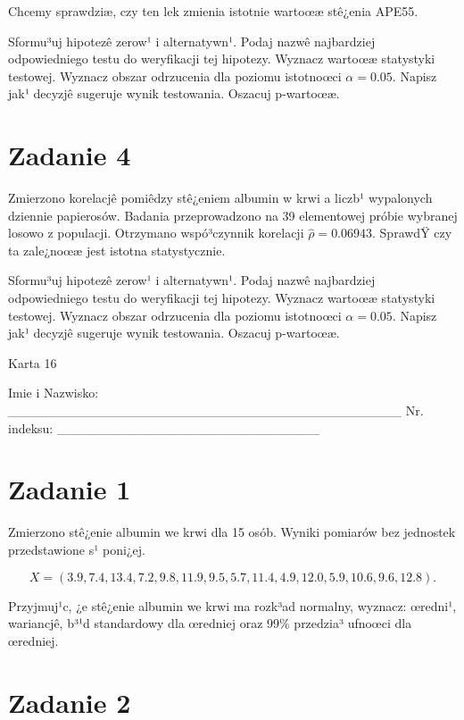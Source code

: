 \documentclass[a4paper,12pt]{article}
\begin{document}
  Chcemy sprawdziæ, czy ten lek zmienia istotnie wartoœæ stê¿enia APE55.
  
  Sformu³uj hipotezê zerow¹ i alternatywn¹. 
  Podaj nazwê najbardziej odpowiedniego testu do weryfikacji tej hipotezy. 
  Wyznacz wartoœæ statystyki testowej. 
  Wyznacz obszar odrzucenia dla poziomu istotnoœci $\alpha=0.05$. 
  Napisz jak¹ decyzjê sugeruje wynik testowania. Oszacuj p-wartoœæ. \vspace{1cm} 

  \section*{Zadanie 4}
     
     Zmierzono korelacjê pomiêdzy stê¿eniem albumin w krwi a liczb¹ wypalonych dziennie papierosów. 
     Badania przeprowadzono na 39 elementowej próbie wybranej losowo z populacji. 
     Otrzymano wspó³czynnik korelacji $\hat\rho = 0.06943 $. 
     SprawdŸ czy ta zale¿noœæ jest istotna statystycznie. 
     
     Sformu³uj hipotezê zerow¹ i alternatywn¹. 
     Podaj nazwê najbardziej odpowiedniego testu do weryfikacji tej hipotezy. 
     Wyznacz wartoœæ statystyki testowej. 
     Wyznacz obszar odrzucenia dla poziomu istotnoœci $\alpha=0.05$. 
     Napisz jak¹ decyzjê sugeruje wynik testowania. 
     Oszacuj p-wartoœæ. \vspace{1cm} 

  \clearpage  Karta  16  

 Imie i Nazwisko: \_\_\_\_\_\_\_\_\_\_\_\_\_\_\_\_\_\_\_\_\_\_\_\_\_\_\_\_\_\_\_\_\_\_\_\_\_\_\_\_\_\_ Nr. indeksu: \_\_\_\_\_\_\_\_\_\_\_\_\_\_\_\_\_\_\_\_\_\_\_\_\_\_\_\_ 
 \section*{Zadanie 1}
     
     Zmierzono stê¿enie albumin we krwi dla 15 osób. 
     Wyniki pomiarów bez jednostek przedstawione s¹ poni¿ej. 
     
     \noindent $$X=(  3.9,  7.4, 13.4,  7.2,  9.8, 11.9,  9.5,  5.7, 11.4,  4.9, 12.0,  5.9, 10.6,  9.6, 12.8 ).$$
     
     Przyjmuj¹c, ¿e stê¿enie albumin we krwi ma rozk³ad normalny, 
     wyznacz: œredni¹, wariancjê, b³¹d standardowy dla œredniej oraz 99\% przedzia³ ufnoœci dla œredniej. \vspace{1cm} 

  \section*{Zadanie 2}
     
\end{document}
